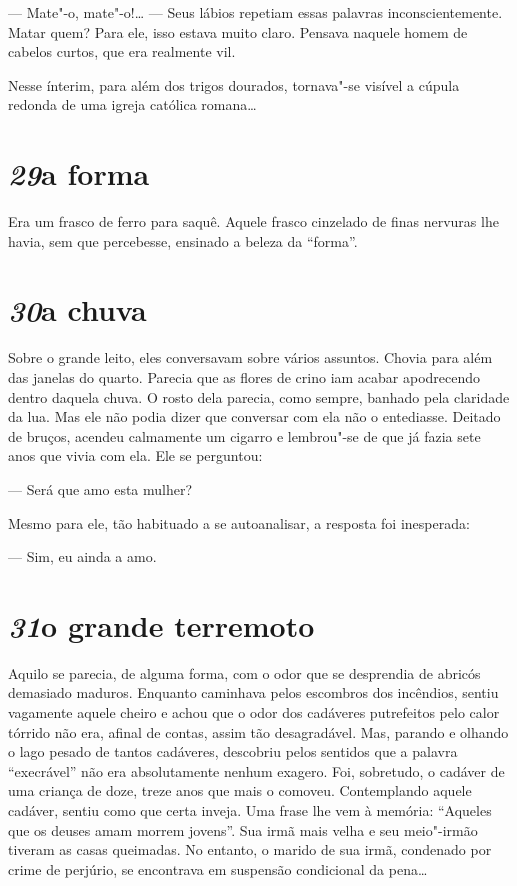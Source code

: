 --- Mate"-o, mate"-o!\ldots{} --- Seus lábios repetiam essas palavras
inconscientemente. Matar quem? Para ele, isso estava muito claro.
Pensava naquele homem de cabelos curtos, que era realmente vil.

Nesse ínterim, para além dos trigos dourados, tornava"-se visível a
cúpula redonda de uma igreja católica romana\ldots{}

\section*{\textit{29}\es a forma}

Era um frasco de ferro para saquê. Aquele frasco cinzelado de finas
nervuras lhe havia, sem que percebesse, ensinado a beleza da ``forma''.

\section*{\textit{30}\es a chuva}

Sobre o grande leito, eles conversavam sobre vários assuntos. Chovia
para além das janelas do quarto. Parecia que as flores de crino iam
acabar apodrecendo dentro daquela chuva. O rosto dela parecia, como
sempre, banhado pela claridade da lua. Mas ele não podia dizer que
conversar com ela não o entediasse. Deitado de bruços, acendeu
calmamente um cigarro e lembrou"-se de que já fazia sete anos que vivia
com ela. Ele se perguntou:

--- Será que amo esta mulher?

Mesmo para ele, tão habituado a se autoanalisar, a resposta foi
inesperada:

--- Sim, eu ainda a amo.

\section*{\textit{31}\es o grande terremoto}

Aquilo se parecia, de alguma forma, com o odor que se desprendia de
abricós demasiado maduros. Enquanto caminhava pelos escombros dos
incêndios, sentiu vagamente aquele cheiro e achou que o odor dos
cadáveres putrefeitos pelo calor tórrido não era, afinal de contas,
assim tão desagradável. Mas, parando e olhando o lago pesado de tantos
cadáveres, descobriu pelos sentidos que a palavra ``execrável'' não era
absolutamente nenhum exagero. Foi, sobretudo, o cadáver de uma criança
de doze, treze anos que mais o comoveu. Contemplando aquele cadáver,
sentiu como que certa inveja. Uma frase lhe vem à memória: ``Aqueles que
os deuses amam morrem jovens''. Sua irmã mais velha e seu meio"-irmão
tiveram as casas queimadas. No entanto, o marido de sua irmã, condenado
por crime de perjúrio, se encontrava em suspensão condicional da pena\ldots{}

